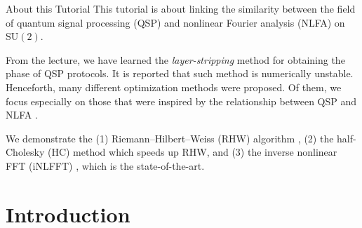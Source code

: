 \begin{frame}{About this Tutorial}
    This tutorial is about linking the similarity between the field of quantum signal processing (QSP) and nonlinear Fourier analysis (NLFA) on $\mathrm{SU}(2)$.

    From the lecture, we have learned the \textit{layer-stripping} method \cite{Tsai,GSLW18} for obtaining the phase of QSP protocols. It is reported that such method is numerically unstable. Henceforth, many different optimization methods were proposed. Of them, we focus especially on those that were inspired by the relationship between QSP and NLFA \cite{alexis_QFT_NLFT}.
    
    We demonstrate the (1) Riemann--Hilbert--Weiss (RHW) algorithm \cite{Szego}, (2) the half-Cholesky (HC) method \cite{half-cholesky} which speeds up RHW, and (3) the inverse nonlinear FFT (iNLFFT) \cite{Lin2025}, which is the state-of-the-art.
\end{frame}

\section{Introduction}
